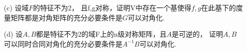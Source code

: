 \begin{itemize}
\begin{itemize}

        \item [(c)] 设域$F$的特征不为2， 且f,g对称，证明V中存在一个基使得$f,g$在此基下的度量矩阵都是对角矩阵的充分必要条件是$G$可以对角化.
        \vspace{3cm}
        


        \item [(d)] 设$A,B$都是特征不为2的域F上的n级对称矩阵，且$A$是可逆的，
        证明$A,B$可以同时合同对角化的充分必要条件是$A^{-1}B$可以对角化.
        \vspace{3cm}
        
    \end{itemize} 
\end{itemize}


